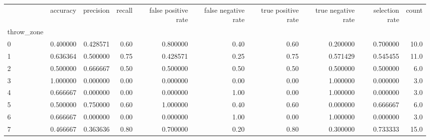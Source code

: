 \begin{tabular}{lrrrrrrrrr}
\toprule
{} &  accuracy &  precision &  recall &  false positive rate &  false negative rate &  true positive rate &  true negative rate &  selection rate &  count \\
throw\_zone &           &            &         &                      &                      &                     &                     &                 &        \\
\midrule
0          &  0.400000 &   0.428571 &    0.60 &             0.800000 &                 0.40 &                0.60 &            0.200000 &        0.700000 &   10.0 \\
1          &  0.636364 &   0.500000 &    0.75 &             0.428571 &                 0.25 &                0.75 &            0.571429 &        0.545455 &   11.0 \\
2          &  0.500000 &   0.666667 &    0.50 &             0.500000 &                 0.50 &                0.50 &            0.500000 &        0.500000 &    6.0 \\
3          &  1.000000 &   0.000000 &    0.00 &             0.000000 &                 0.00 &                0.00 &            1.000000 &        0.000000 &    3.0 \\
4          &  0.666667 &   0.000000 &    0.00 &             0.000000 &                 1.00 &                0.00 &            1.000000 &        0.000000 &    3.0 \\
5          &  0.500000 &   0.750000 &    0.60 &             1.000000 &                 0.40 &                0.60 &            0.000000 &        0.666667 &    6.0 \\
6          &  0.666667 &   0.000000 &    0.00 &             0.000000 &                 1.00 &                0.00 &            1.000000 &        0.000000 &    3.0 \\
7          &  0.466667 &   0.363636 &    0.80 &             0.700000 &                 0.20 &                0.80 &            0.300000 &        0.733333 &   15.0 \\
\bottomrule
\end{tabular}
